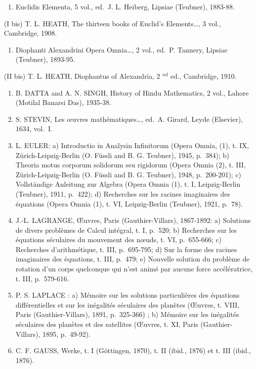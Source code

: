 
\begin{enumerate}
\def\labelenumi{(\Roman{enumi})}
\tightlist
\item
  Euclidis Elementa, 5 vol., ed.~J. L. Heiberg, Lipsiae (Teubner), 1883-88.
\end{enumerate}

(I bis) T. L. HEATH, The thirteen books of Euclid's Elements\ldots, 3 vol., Cambridge, 1908.

\begin{enumerate}
\def\labelenumi{(\Roman{enumi})}
\setcounter{enumi}{1}
\tightlist
\item
  Diophanti Alexandrini Opera Omnia\ldots, 2 vol., ed.~P. Tannery, Lipsiae (Teubner), 1893-95.
\end{enumerate}

(II bis) T. L. HEATH, Diophantus of Alexandria, 2 \(^{nd}\) ed., Cambridge, 1910.

\begin{enumerate}
\def\labelenumi{(\Roman{enumi})}
\setcounter{enumi}{2}
\item
  B. DATTA and A. N. SINGH, History of Hindu Mathematics, 2 vol., Lahore (Motilal Banarsi Das), 1935-38.
\item
  S. STEVIN, Les œuvres mathématiques\ldots, ed.~A. Girard, Leyde (Elsevier), 1634, vol.~I.
\item
  L. EULER: a) Introductio in Analysin Infinitorum (Opera Omnia, (1), t. IX, Zürich-Leipzig-Berlin (O. Füssli and B. G. Teubner), 1945, p.~384); b) Theoria motus corporum solidorum seu rigidorum (Opera Omnia (2), t. III, Zürich-Leipzig-Berlin (O. Füssli and B. G. Teubner), 1948, p.~200-201); c) Vollständige Anleitung zur Algebra (Opera Omnia (1), t. I, Leipzig-Berlin (Teubner), 1911, p.~422); d) Recherches sur les racines imaginaires des équations (Opera Omnia (1), t. VI, Leipzig-Berlin (Teubner), 1921, p.~78).
\item
  J.-L. LAGRANGE, Œuvres, Paris (Gauthier-Villars), 1867-1892: a) Solutions de divers problèmes de Calcul intégral, t. I, p.~520; b) Recherches sur les équations séculaires du mouvement des nœuds, t. VI, p.~655-666; c) Recherches d'arithmétique, t. III, p.~695-795; d) Sur la forme des racines imaginaires des équations, t. III, p.~479; e) Nouvelle solution du problème de rotation d'un corps quelconque qui n'est animé par aucune force accélératrice, t. III, p.~579-616.
\item
  P. S. LAPLACE : a) Mémoire sur les solutions particulières des équations différentielles et sur les inégalités séculaires des planètes (Œuvres, t. VIII, Paris (Gauthier-Villars), 1891, p.~325-366) ; b) Mémoire sur les inégalités séculaires des planètes et des satellites (Œuvres, t. XI, Paris (Gauthier-Villars), 1895, p.~49-92).
\item
  C. F. GAUSS, Werke, t. I (Göttingen, 1870), t. II (ibid., 1876) et t. III (ibid., 1876).
\end{enumerate}

